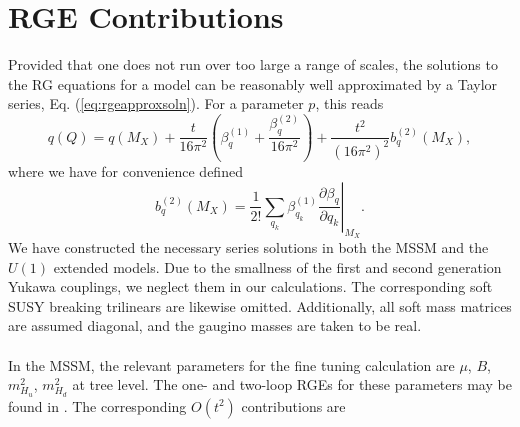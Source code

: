 \documentclass[preprint,amsmath,amssymb,aps,superscriptaddress,prd,showpacs,floatfix,nofootinbib]{revtex4-1}
\begin{document}
\section{\label{app:rges}RGE Contributions}
Provided that one does not run over too large a range of scales, the
solutions to the RG equations for a model can be reasonably well
approximated by a Taylor series, Eq. (\ref{eq:rgeapproxsoln}).  For a
parameter $p$, this reads
\begin{equation*}
q(Q)=q(M_X)+\frac{t}{16\pi^2}\left ( \beta_q^{(1)}+\frac{\beta_q^{(2)}}{16\pi^2}\right )+\frac{t^2}{(16\pi^2)^2}b_q^{(2)}(M_X),
\end{equation*}
where we have for convenience defined
\begin{equation*}
b_q^{(2)}(M_X)=\frac{1}{2!}\left . \sum_{q_k}\beta_{q_k}^{(1)}\frac{\partial \beta_q}{\partial q_k}\right |_{M_X}.
\end{equation*}
We have constructed the necessary series solutions in both the MSSM
and the $U(1)$ extended models. Due to the smallness of the first and
second generation Yukawa couplings, we neglect them in our
calculations. The corresponding soft SUSY breaking trilinears are
likewise omitted. Additionally, all soft mass matrices are assumed
diagonal, and the gaugino masses are taken to be real.\\ \\ In the
MSSM, the relevant parameters for the fine tuning calculation are
$\mu$, $B$, $m_{H_u}^2$, $m_{H_d}^2$ at tree level. The one- and
two-loop RGEs for these parameters may be found in
\cite{Martin:1993zk}. The corresponding $O(t^2)$ contributions are
\end{document}
